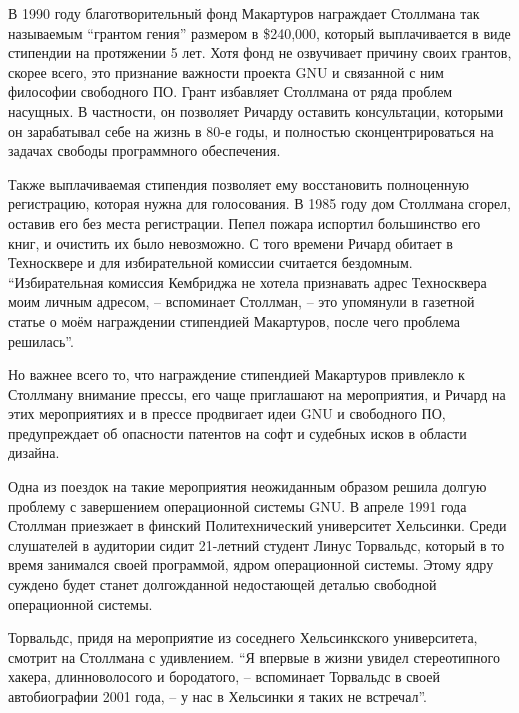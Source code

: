 В 1990 году благотворительный фонд Макартуров награждает Столлмана так называемым ``грантом гения'' размером в \$240,000, который выплачивается в виде стипендии на протяжении 5 лет. Хотя фонд не озвучивает причину своих грантов, скорее всего, это признание важности проекта GNU и связанной с ним философии свободного ПО. Грант избавляет Столлмана от ряда проблем насущных. В частности, он позволяет Ричарду оставить консультации, которыми он зарабатывал себе на жизнь в 80-е годы, и полностью сконцентрироваться на задачах свободы программного обеспечения.

Также выплачиваемая стипендия позволяет ему восстановить полноценную регистрацию, которая нужна для голосования. В 1985 году дом Столлмана сгорел, оставив его без места регистрации. Пепел пожара испортил большинство его книг, и очистить их было невозможно. С того времени Ричард обитает в Техносквере и для избирательной комиссии считается бездомным. ``Избирательная комиссия Кембриджа не хотела признавать адрес Техносквера моим личным адресом, -- вспоминает Столлман, -- это упомянули в газетной статье о моём награждении стипендией Макартуров, после чего проблема решилась''.

Но важнее всего то, что награждение стипендией Макартуров привлекло к Столлману внимание прессы, его чаще приглашают на мероприятия, и Ричард на этих мероприятиях и в прессе продвигает идеи GNU и свободного ПО, предупреждает об опасности патентов на софт и судебных исков в области дизайна.

Одна из поездок на такие мероприятия неожиданным образом решила долгую проблему с завершением операционной системы GNU. В апреле 1991 года Столлман приезжает в финский Политехнический университет Хельсинки. Среди слушателей в аудитории сидит 21-летний студент Линус Торвальдс, который в то время занимался своей программой, ядром операционной системы. Этому ядру суждено будет станет долгожданной недостающей деталью свободной операционной системы.

Торвальдс, придя на мероприятие из соседнего Хельсинкского университета, смотрит на Столлмана с удивлением. ``Я впервые в жизни увидел стереотипного хакера, длинноволосого и бородатого, -- вспоминает Торвальдс в своей автобиографии 2001 года, -- у нас в Хельсинки я таких не встречал''. 

